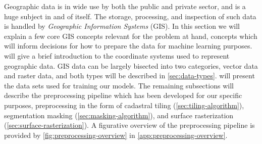 Geographic data is in wide use by both the public and private sector, and is a huge subject in and of itself.
The storage, processing, and inspection of such data is handled by \textit{Geographic Information Systems} (GIS).
In this section we will explain a few core GIS concepts relevant for the problem at hand, concepts which will inform decisions for how to prepare the data for machine learning purposes.
 will give a brief introduction to the coordinate systems used to represent geographic data.
GIS data can be largely bisected into two categories, vector data and raster data, and both types will be described in \cref{sec:data-types}.
 will present the data sets used for training our models.
The remaining subsections will describe the preprocessing pipeline which has been developed for our specific purposes, preprocessing in the form of cadastral tiling (\cref{sec:tiling-algorithm}), segmentation masking (\cref{sec:masking-algorithm}), and surface rasterization (\cref{sec:surface-rasterization}).
A figurative overview of the preprocessing pipeline is provided by \cref{fig:preprocessing-overview} in \cref{app:preprocessing-overview}.
